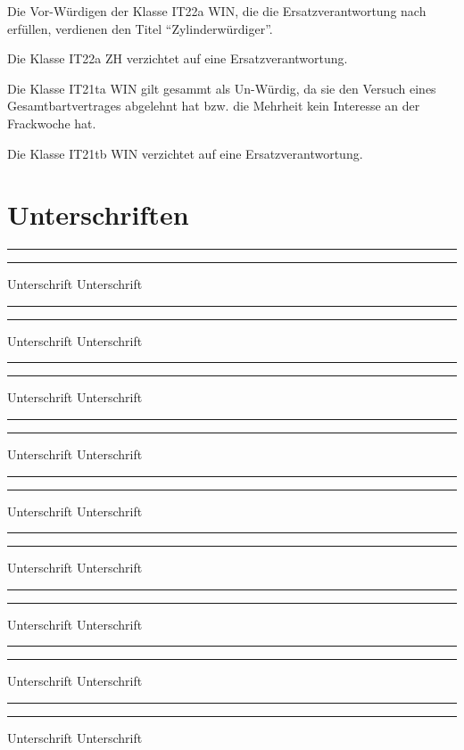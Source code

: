 \documentclass[fontsize=12pt,parskip=half]{scrartcl}
\begin{document}
\begin{contract}
  \SubClause[title={Titel}]\label{KlasseIT22aWIN.titel}
  Die Vor-Würdigen der Klasse IT22a WIN, die die Ersatzverantwortung nach  erfüllen, verdienen den Titel ``Zylinderwürdiger''.

  \Clause[title={Klasse IT22a ZH}]
  Die Klasse IT22a ZH verzichtet auf eine Ersatzverantwortung.

  \Clause[title={Klasse IT21ta WIN}]
  Die Klasse IT21ta WIN gilt gesammt als Un-Würdig, da sie den Versuch eines Gesamtbartvertrages abgelehnt hat bzw. die Mehrheit kein Interesse an der Frackwoche hat.

  \Clause[title={Klasse IT21tb WIN}]
  Die Klasse IT21tb WIN verzichtet auf eine Ersatzverantwortung.
\end{contract}


\pagebreak
\section{Unterschriften}
\vspace{50pt}
\noindent\rule{7cm}{.4pt}\hfill\rule{7cm}{.4pt}\par
\noindent Unterschrift \hfill Unterschrift

\vspace{50pt}
\noindent\rule{7cm}{.4pt}\hfill\rule{7cm}{.4pt}\par
\noindent Unterschrift \hfill Unterschrift

\vspace{50pt}
\noindent\rule{7cm}{.4pt}\hfill\rule{7cm}{.4pt}\par
\noindent Unterschrift \hfill Unterschrift

\vspace{50pt}
\noindent\rule{7cm}{.4pt}\hfill\rule{7cm}{.4pt}\par
\noindent Unterschrift \hfill Unterschrift

\vspace{50pt}
\noindent\rule{7cm}{.4pt}\hfill\rule{7cm}{.4pt}\par
\noindent Unterschrift \hfill Unterschrift

\vspace{50pt}
\noindent\rule{7cm}{.4pt}\hfill\rule{7cm}{.4pt}\par
\noindent Unterschrift \hfill Unterschrift

\vspace{50pt}
\noindent\rule{7cm}{.4pt}\hfill\rule{7cm}{.4pt}\par
\noindent Unterschrift \hfill Unterschrift

\vspace{50pt}
\noindent\rule{7cm}{.4pt}\hfill\rule{7cm}{.4pt}\par
\noindent Unterschrift \hfill Unterschrift

\vspace{50pt}
\noindent\rule{7cm}{.4pt}\hfill\rule{7cm}{.4pt}\par
\noindent Unterschrift \hfill Unterschrift
\end{document}
